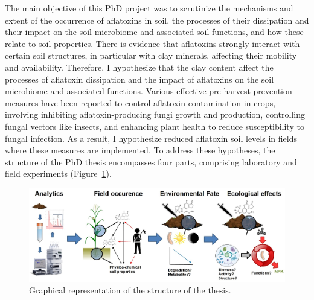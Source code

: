 The main objective of this PhD project was to scrutinize the mechanisms and extent of the occurrence of aflatoxins in soil, the processes of their dissipation and their impact on the soil microbiome and associated soil functions, and how these relate to soil properties.
There is evidence that aflatoxins strongly interact with certain soil structures, in particular with clay minerals, affecting their mobility and availability. Therefore, I hypothesize that the clay content affect the processes of aflatoxin dissipation and the impact of aflatoxins on the soil microbiome and associated functions. Various effective pre-harvest prevention measures have been reported to control aflatoxin contamination in crops, involving inhibiting aflatoxin-producing fungi growth and production, controlling fungal vectors like insects, and enhancing plant health to reduce susceptibility to fungal infection. As a result, I hypothesize reduced aflatoxin soil levels in fields where these measures are implemented. To address these hypotheses, the structure of the PhD thesis encompasses four parts, comprising laboratory and field experiments (Figure~\ref{fig:Thesis_structure}). 

\begin{figure}[ht!]
\centering
 \includegraphics[width=1.125\textwidth,center]{figures/thesis structure.jpg}
\decoRule
\captionsetup{labelfont=bf, justification=raggedright, singlelinecheck=off, width=1.125\textwidth}
\caption{Graphical representation of the structure of the thesis.}
\label{fig:Thesis_structure}
\end{figure}
\afterpage{\FloatBarrier}


